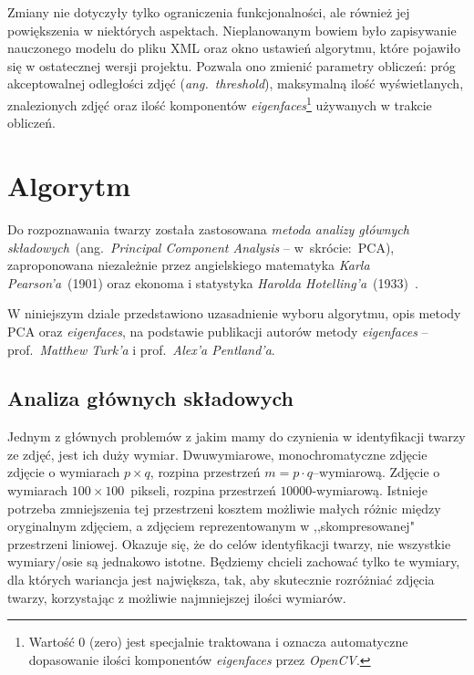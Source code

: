 \documentclass[a4paper,titlepage]{article}
\theoremstyle{break}
\numberwithin{equation}{subsection}
\begin{document}
Zmiany nie dotyczyły tylko ograniczenia funkcjonalności, ale również jej powiększenia w niektórych aspektach. Nieplanowanym bowiem było zapisywanie nauczonego modelu do pliku XML oraz okno ustawień algorytmu, które pojawiło się w ostatecznej wersji projektu. Pozwala ono zmienić parametry obliczeń: próg akceptowalnej odległości zdjęć (\emph{ang.~threshold}), maksymalną ilość wyświetlanych, znalezionych zdjęć oraz ilość komponentów \emph{eigenfaces}\footnote{Wartość 0 (zero) jest specjalnie traktowana i oznacza automatyczne dopasowanie ilości komponentów \emph{eigenfaces} przez \emph{OpenCV}.} używanych w trakcie obliczeń.


\section{Algorytm}
\label{sec:algorytm}

Do rozpoznawania twarzy została zastosowana \emph{metoda analizy głównych składowych}~(ang.~\emph{Principal Component Analysis} -- w~skrócie:~PCA), zaproponowana niezależnie przez angielskiego matematyka \emph{Karla Pearson'a}~(1901) oraz ekonoma i statystyka \emph{Harolda Hotelling'a}~(1933)~\cite{pearson}.

W niniejszym dziale przedstawiono uzasadnienie wyboru algorytmu, opis metody PCA oraz \emph{eigenfaces}, na podstawie publikacji autorów metody \emph{eigenfaces} -- prof.~\emph{Matthew Turk'a} i prof.~\emph{Alex'a Pentland'a}\cite{turk}.


\subsection{Analiza głównych składowych}

Jednym z głównych problemów z jakim mamy do czynienia w identyfikacji twarzy ze zdjęć, jest ich duży wymiar. Dwuwymiarowe, monochromatyczne zdjęcie zdjęcie o wymiarach $p\times q$, rozpina przestrzeń $m=p\cdot q$--wymiarową. Zdjęcie o wymiarach $100\times 100$~pikseli, rozpina przestrzeń $10000$-wymiarową. Istnieje potrzeba zmniejszenia tej przestrzeni kosztem możliwie małych różnic między oryginalnym zdjęciem, a zdjęciem reprezentowanym w ,,skompresowanej" przestrzeni liniowej. Okazuje się, że do celów identyfikacji twarzy, nie wszystkie wymiary/osie są jednakowo istotne. Będziemy chcieli zachować tylko te wymiary, dla których wariancja jest największa, tak, aby skutecznie rozróżniać zdjęcia twarzy, korzystając z możliwie najmniejszej ilości wymiarów\cite{www:opencv}.
\end{document}
